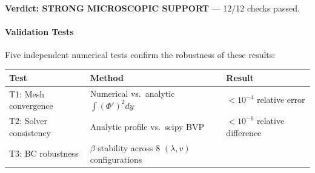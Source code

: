 \documentclass[
  11pt,
]{article}
\begin{document}
\textbf{Verdict: STRONG MICROSCOPIC SUPPORT} --- 12/12 checks passed.

\bigskip

\hypertarget{validation-tests}{%
\paragraph{Validation Tests}\label{validation-tests}}

Five independent numerical tests confirm the robustness of these
results:

\begin{longtable}[]{@{}lll@{}}
\toprule
\begin{minipage}[b]{0.30\columnwidth}\raggedright
Test\strut
\end{minipage} & \begin{minipage}[b]{0.30\columnwidth}\raggedright
Method\strut
\end{minipage} & \begin{minipage}[b]{0.30\columnwidth}\raggedright
Result\strut
\end{minipage}\tabularnewline
\midrule
\endhead
\begin{minipage}[t]{0.30\columnwidth}\raggedright
T1: Mesh convergence\strut
\end{minipage} & \begin{minipage}[t]{0.30\columnwidth}\raggedright
Numerical vs.~analytic \(\int(\Phi')^2 dy\)\strut
\end{minipage} & \begin{minipage}[t]{0.30\columnwidth}\raggedright
\(< 10^{-4}\) relative error\strut
\end{minipage}\tabularnewline
\begin{minipage}[t]{0.30\columnwidth}\raggedright
T2: Solver consistency\strut
\end{minipage} & \begin{minipage}[t]{0.30\columnwidth}\raggedright
Analytic profile vs.~scipy BVP\strut
\end{minipage} & \begin{minipage}[t]{0.30\columnwidth}\raggedright
\(< 10^{-6}\) relative difference\strut
\end{minipage}\tabularnewline
\begin{minipage}[t]{0.30\columnwidth}\raggedright
T3: BC robustness\strut
\end{minipage} & \begin{minipage}[t]{0.30\columnwidth}\raggedright
\(\beta\) stability across 8 \((\lambda, v)\) configurations\strut

\end{minipage}
\end{longtable}
\end{document}
